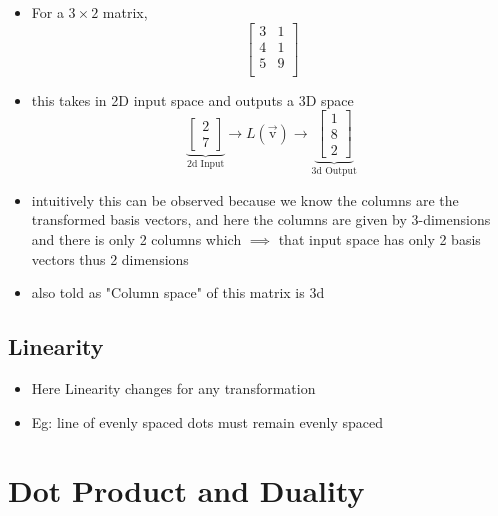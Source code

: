 \documentclass[a4paper]{article}
\begin{document}
\begin{itemize}
	\item For a $3 \times 2$ matrix,
	      \[
		      \begin{bmatrix} 3 & 1 \\
                4 & 1 \\
                5 & 9 \\\end{bmatrix}
	      \]
	\item this takes in 2D input space and outputs a 3D space
	      \[
		      \underbrace{
			      \begin{bmatrix} 2 \\
				      7\end{bmatrix}
		      }_{\text{2d Input}}
		      \to
		      L(\vec{\text{v}})
		      \to
		      \underbrace{
			      \begin{bmatrix} 1 \\
				      8 \\
				      2\end{bmatrix}
		      }_{\text{3d Output}}
	      \]
	\item intuitively this can be observed because we know the columns are the
	      \newline transformed basis vectors, and here the columns are given by
	      3-dimensions and there is only 2 columns which $\implies$ that
	      input space has only 2 basis vectors thus 2 dimensions
	\item also told as "Column space" of this matrix is 3d
\end{itemize}

\subsection{Linearity}
\begin{itemize}
	\item Here Linearity changes for any transformation
	\item Eg: line of evenly spaced dots must remain evenly spaced
\end{itemize}

\newpage
\section{Dot Product and Duality}
\end{document}
